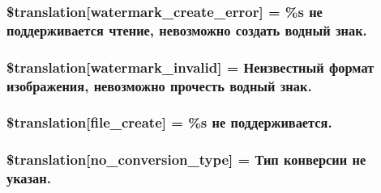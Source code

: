 \subsubsection[{\$translation}]{\setlength{\rightskip}{0pt plus 5cm}\$translation\mbox{[}\textquotesingle{}watermark\+\_\+create\+\_\+error\textquotesingle{}\mbox{]} = \textquotesingle{}\%s не поддерживается чтение, невозможно создать водный знак.\textquotesingle{}}\label{class_8upload_8ru___r_u_8php_aabca0b65dadbc6184415c16375f284ca}
\hypertarget{class_8upload_8ru___r_u_8php_ac336e7a5701e47ba4a05e9e498a3cc44}{}
\subsubsection[{\$translation}]{\setlength{\rightskip}{0pt plus 5cm}\$translation\mbox{[}\textquotesingle{}watermark\+\_\+invalid\textquotesingle{}\mbox{]} = \textquotesingle{}Неизвестный формат изображения, невозможно прочесть водный знак.\textquotesingle{}}\label{class_8upload_8ru___r_u_8php_ac336e7a5701e47ba4a05e9e498a3cc44}
\hypertarget{class_8upload_8ru___r_u_8php_a1ecb4673e4fb69e06b3f20b65cecf30a}{}
\subsubsection[{\$translation}]{\setlength{\rightskip}{0pt plus 5cm}\$translation\mbox{[}\textquotesingle{}file\+\_\+create\textquotesingle{}\mbox{]} = \textquotesingle{}\%s не поддерживается.\textquotesingle{}}\label{class_8upload_8ru___r_u_8php_a1ecb4673e4fb69e06b3f20b65cecf30a}
\hypertarget{class_8upload_8ru___r_u_8php_a4712d7ec28e9a7f17eb3338af2358363}{}
\subsubsection[{\$translation}]{\setlength{\rightskip}{0pt plus 5cm}\$translation\mbox{[}\textquotesingle{}no\+\_\+conversion\+\_\+type\textquotesingle{}\mbox{]} = \textquotesingle{}Тип конверсии не указан.\textquotesingle{}}\label{class_8upload_8ru___r_u_8php_a4712d7ec28e9a7f17eb3338af2358363}
\hypertarget{class_8upload_8ru___r_u_8php_a783c9358bcf54a054545b50098bc679b}{}
